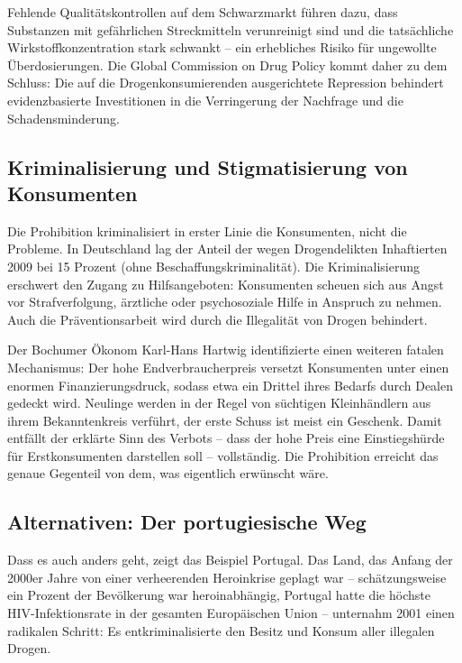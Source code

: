 \documentclass[11pt,a4paper]{article}
\begin{document}
	Fehlende Qualitätskontrollen auf dem Schwarzmarkt führen dazu, dass Substanzen mit gefährlichen Streckmitteln verunreinigt sind und die tatsächliche Wirkstoffkonzentration stark schwankt – ein erhebliches Risiko für ungewollte Überdosierungen. Die Global Commission on Drug Policy kommt daher zu dem Schluss: Die auf die Drogenkonsumierenden ausgerichtete Repression behindert evidenzbasierte Investitionen in die Verringerung der Nachfrage und die Schadensminderung.\cite{nobis-failure}
	
	\subsection{Kriminalisierung und Stigmatisierung von Konsumenten}
	
	Die Prohibition kriminalisiert in erster Linie die Konsumenten, nicht die Probleme. In Deutschland lag der Anteil der wegen Drogendelikten Inhaftierten 2009 bei 15 Prozent (ohne Beschaffungskriminalität).\cite{drug-war-failure} Die Kriminalisierung erschwert den Zugang zu Hilfsangeboten: Konsumenten scheuen sich aus Angst vor Strafverfolgung, ärztliche oder psychosoziale Hilfe in Anspruch zu nehmen. Auch die Präventionsarbeit wird durch die Illegalität von Drogen behindert.
	
	Der Bochumer Ökonom Karl-Hans Hartwig identifizierte einen weiteren fatalen Mechanismus: Der hohe Endverbraucherpreis versetzt Konsumenten unter einen enormen Finanzierungsdruck, sodass etwa ein Drittel ihres Bedarfs durch Dealen gedeckt wird. Neulinge werden in der Regel von süchtigen Kleinhändlern aus ihrem Bekanntenkreis verführt, der erste Schuss ist meist ein Geschenk. Damit entfällt der erklärte Sinn des Verbots – dass der hohe Preis eine Einstiegshürde für Erstkonsumenten darstellen soll – vollständig. Die Prohibition erreicht das genaue Gegenteil von dem, was eigentlich erwünscht wäre.\cite{spiegel-prohibition}
	
	\subsection{Alternativen: Der portugiesische Weg}
	
	Dass es auch anders geht, zeigt das Beispiel Portugal. Das Land, das Anfang der 2000er Jahre von einer verheerenden Heroinkrise geplagt war – schätzungsweise ein Prozent der Bevölkerung war heroinabhängig, Portugal hatte die höchste HIV-Infektionsrate in der gesamten Europäischen Union – unternahm 2001 einen radikalen Schritt: Es entkriminalisierte den Besitz und Konsum aller illegalen Drogen.\cite{portugal-model}
	
\end{document}
